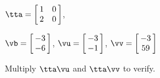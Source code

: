 {$\tta = \left[\hskip -3pt \begin{array}{cc} 1&0\\   2&0 \end{array}\hskip -3pt \right] $, 

$\vb=\left[\hskip -3pt \begin{array}{c} -3\\   -6 \end{array}\hskip -3pt \right] $, 
$\vu = \left[\hskip -3pt \begin{array}{c} -3\\ -1 \end{array}\hskip -3pt \right]$, $\vv = \left[\hskip -3pt \begin{array}{c} -3\\ 59 \end{array}\hskip -3pt \right] $}
{Multiply $\tta\vu$ and $\tta\vv$ to verify.}




